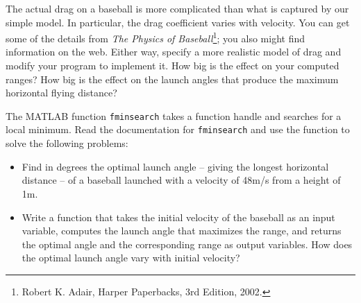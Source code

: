 \documentclass[
]{book}
\begin{document}
\begin{ex}
	The actual drag on a baseball is more complicated than what is
captured by our simple model.  In particular, the drag coefficient
varies with velocity.  You can get some of the details from {\em The
Physics of Baseball}\footnote{Robert K. Adair, Harper Paperbacks, 3rd
Edition, 2002.}; you also might find information on the web.
Either way, specify a more realistic model of drag and modify your
program to implement it.  How big is the effect on your computed
ranges?  How big is the effect on the launch angles that produce the
maximum horizontal flying distance?
\end{ex}

\begin{ex}
The MATLAB function {\tt fminsearch} takes a function handle
and searches for a local minimum.  Read the documentation for
{\tt fminsearch} and use the function to solve the following problems:

\begin{itemize}

\item Find in degrees the optimal launch angle -- giving the longest horizontal distance --
of a baseball launched with a velocity of 48m/s from a height of 1m.

\item Write a function that takes the initial velocity of the baseball
as an input variable, computes the launch angle that maximizes
the range, and returns the optimal angle and the corresponding range as output variables.
How does the optimal launch angle vary with initial velocity?

\end{itemize}
\end{ex}
\end{document}
